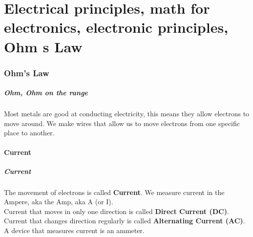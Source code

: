 \documentclass[10pt]{beamer}
\begin{document}
\part{Electrical principles, math for electronics, electronic principles, Ohm s Law}
\section{Ohm's Law}
\begin{frame}
\frametitle{Ohm, Ohm on the range}
Most metals are good at conducting electricity, this means they allow electrons to move around. We make wires that allow us to move electrons from one specific place to another.
\end{frame}
\subsection{Current}
\begin{frame}
\frametitle{Current}
The movement of electrons is called \textbf{Current}. We measure current in the Ampere, aka the Amp, aka A (or I).\\
Current that moves in only one direction is called \textbf{Direct Current (DC)}. Current that changes direction regularly is called \textbf{Alternating Current (AC)}.\\
A device that measures current is an ammeter.
\end{frame}
\end{document}
